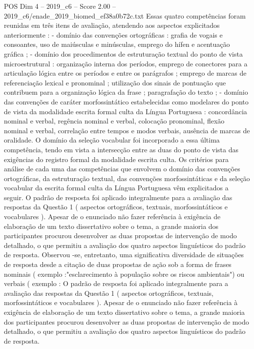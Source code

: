 \begin{textsample}{POS Dim 4 – 2019\_c6 – Score 2.00 – 2019\_c6/enade\_2019\_biomed\_ef38a0b72c.txt}
Essas quatro competências foram reunidas em três itens de avaliação, atendendo aos aspectos explicitados anteriormente : - domínio das convenções ortográficas : grafia de vogais e consoantes, uso de maiúsculas e minúsculas, emprego do hífen e acentuação gráfica ; - domínio dos procedimentos de estruturação textual do ponto de vista microestrutural : organização interna dos períodos, emprego de conectores para a articulação lógica entre os períodos e entre os parágrafos ; emprego de marcas de referenciação lexical e pronominal ; utilização dos sinais de pontuação que contribuem para a organização lógica da frase ; paragrafação do texto ; - domínio das convenções de caráter morfossintático estabelecidas como modelares do ponto de vista da modalidade escrita formal culta da Língua Portuguesa : concordância nominal e verbal, regência nominal e verbal, colocação pronominal, flexão nominal e verbal, correlação entre tempos e modos verbais, ausência de marcas de oralidade.
O domínio da seleção vocabular foi incorporado a essa última competência, tendo em vista a intersecção entre as duas do ponto de vista das exigências do registro formal da modalidade escrita culta.
Os critérios para análise de cada uma das competências que envolvem o domínio das convenções ortográficas, da estruturação textual, das convenções morfossintáticas e da seleção vocabular da escrita formal culta da Língua Portuguesa vêm explicitados a seguir.
O padrão de resposta foi aplicado integralmente para a avaliação das respostas da Questão 1 ( aspectos ortográficos, textuais, morfossintáticos e vocabulares ).
Apesar de o enunciado não fazer referência à exigência de elaboração de um texto dissertativo sobre o tema, a grande maioria dos participantes procurou desenvolver as duas propostas de intervenção de modo detalhado, o que permitiu a avaliação dos quatro aspectos linguísticos do padrão de resposta.
Observou -se, entretanto, uma significativa diversidade de situações de resposta desde a citação de duas propostas de ação sob a forma de frases nominais ( exemplo :"esclarecimento à população sobre os riscos ambientais") ou verbais ( exemplo : O padrão de resposta foi aplicado integralmente para a avaliação das respostas da Questão 1 ( aspectos ortográficos, textuais, morfossintáticos e vocabulares ).
Apesar de o enunciado não fazer referência à exigência de elaboração de um texto dissertativo sobre o tema, a grande maioria dos participantes procurou desenvolver as duas propostas de intervenção de modo detalhado, o que permitiu a avaliação dos quatro aspectos linguísticos do padrão de resposta.

\end{textsample}
